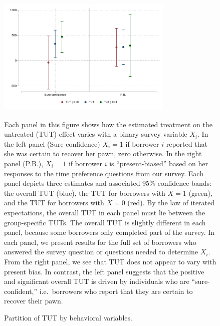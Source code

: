 \documentclass[oneside,11pt]{article}
\begin{document}
\begin{figure}[H]
    \caption{Partition of TUT by behavioral variables.}
    \label{tut_beh_partition}
    \begin{center}
        \centering
        \includegraphics[width=0.75\textwidth]{Figuras/tut_beh_partition.pdf} 
    \end{center}
     \scriptsize  Each panel in this figure shows how the estimated treatment on the untreated (TUT) effect varies with a binary survey variable $X_i$. In the left panel (Sure-confidence) $X_i = 1$ if  borrower $i$ reported that she was certain to recover her pawn, zero otherwise. In the right panel (P.B.), $X_i = 1$ if borrower $i$ is ``present-biased'' based on her responses to the time preference questions from our survey. Each panel depicts three estimates and associated 95\% confidence bands: the overall TUT (blue), the TUT for borrowers with $X = 1$ (green), and the TUT for borrowers with $X = 0$ (red). By the law of iterated expectations, the overall TUT in each panel must lie between the group-specific TUTs. The overall TUT is slightly different in each panel, because some borrowers only completed part of the survey. In each panel, we present results for the full set of borrowers who answered the survey question or questions needed to determine $X_i$. From the right panel, we see that TUT does not appear to vary with present bias. In contrast, the left panel suggests that the positive and significant overall TUT is driven by individuals who are ``sure-confident,'' i.e.\ borrowers who report that they are certain to recover their pawn.

\end{figure}
\end{document}
